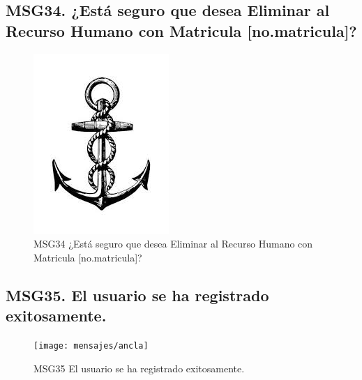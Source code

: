     \subsection{MSG34. ¿Está seguro que desea Eliminar al Recurso Humano con Matricula [no.matricula]?}
        \begin{figure}[htbp]
            \begin{center}
                \includegraphics[width=.4\textwidth]{images/MSG/ancla}
                \caption{MSG34 ¿Está seguro que desea Eliminar al Recurso Humano con Matricula [no.matricula]?}
                \label{fig:MSG34}
            \end{center}
        \end{figure}

	\subsection{MSG35. El usuario se ha registrado exitosamente.}
    \begin{figure}[htbp]
        \begin{center}
            \texttt{[image: mensajes/ancla]}
            \caption{MSG35 El usuario se ha registrado exitosamente.}
            \label{fig:MSG35}
        \end{center}
    \end{figure}




